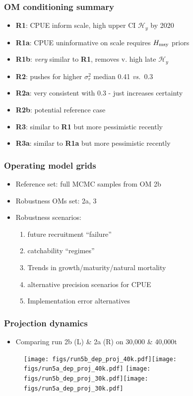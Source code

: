 \documentclass{beamer}
\newcommand{\sigr}{\sigma^2_r}
\newcommand{\hmsy}{H_{\rm msy}}
\newcommand{\vs}{\textit{vs.}~}
\begin{document}
\begin{frame}
    \frametitle{OM conditioning summary}
\begin{itemize}
    \item \textbf{R1}: CPUE inform scale, high upper CI $\mathcal{H}_y$ by 2020
    \item \textbf{R1a}: CPUE uninformative on scale requires $\hmsy$ priors
    \item \textbf{R1b}: \emph{very} similar to \textbf{R1}, removes v. high late $\mathcal{H}_y$
    \item \textbf{R2}: pushes for higher $\sigr$ median 0.41 \vs 0.3
    \item \textbf{R2a}: very consistent with 0.3 - just increases certainty
    \item \textbf{R2b}: potential reference case
    \item \textbf{R3}: similar to \textbf{R1} but more pessimistic recently
    \item \textbf{R3a}: similar to \textbf{R1a} but more pessimistic recently 
\end{itemize}
\end{frame}

\begin{frame}
    \frametitle{Operating model grids}
\begin{itemize}
    \item Reference set: full MCMC samples from OM 2b
    \item Robustness OMs set: 2a, 3
    \item Robustness scenarios: 
        \begin{enumerate} 
            \item future recruitment ``failure'' 
            \item catchability ``regimes''
            \item Trends in growth/maturity/natural mortality
            \item alternative precision scenarios for CPUE
            \item Implementation error alternatives
        \end{enumerate}
\end{itemize}
\end{frame}

\begin{frame}
    \frametitle{Projection dynamics}
\begin{itemize}
    \item Comparing run 2b (L) \& 2a (R) on 30,000 \& 40,000t
\end{itemize}
    \begin{figure}
    \begin{center}   
        \texttt{[image: figs/run5b\_dep\_proj\_40k.pdf]}\texttt{[image: figs/run5a\_dep\_proj\_40k.pdf]}
        \texttt{[image: figs/run5b\_dep\_proj\_30k.pdf]}\texttt{[image: figs/run5a\_dep\_proj\_30k.pdf]} 
    \end{center}
    \end{figure}
\end{frame}
\end{document}
